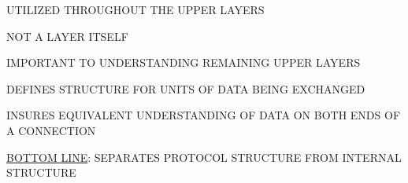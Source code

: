 



\begin{bwslide}

\begin{nrtc}
\item	UTILIZED THROUGHOUT THE UPPER LAYERS
\item	NOT A LAYER ITSELF
\item	IMPORTANT TO UNDERSTANDING REMAINING UPPER LAYERS
\end{nrtc}
\end{bwslide}


\begin{bwslide}

\begin{nrtc}
\item	DEFINES STRUCTURE FOR UNITS OF DATA BEING EXCHANGED
\item	INSURES EQUIVALENT UNDERSTANDING OF DATA ON BOTH ENDS OF A CONNECTION
\item	\underline{BOTTOM LINE}: SEPARATES PROTOCOL STRUCTURE FROM 
			INTERNAL STRUCTURE
\end{nrtc}
\end{bwslide}


%
%
%


